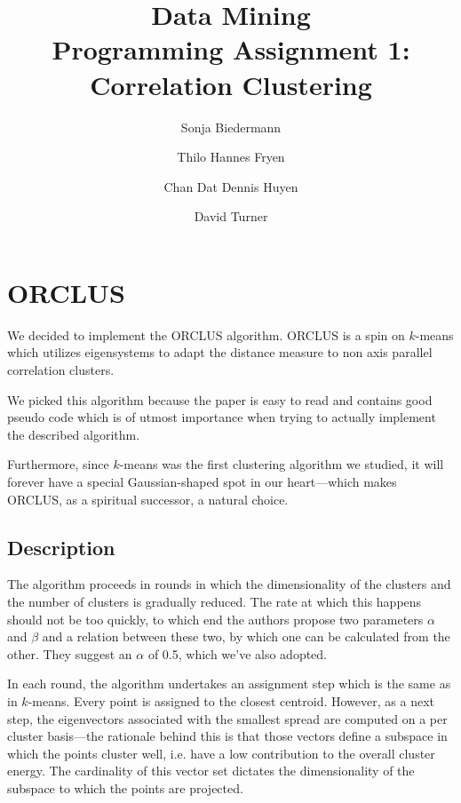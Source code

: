 \documentclass[english]{scrartcl}
\begin{document}
\title{Data Mining\\Programming Assignment 1: Correlation Clustering}

\author{Sonja Biedermann \and Thilo Hannes Fryen \and Chan Dat Dennis Huyen \and David Turner}

\maketitle
\tableofcontents

\section{ORCLUS}

We decided to implement the ORCLUS algorithm. ORCLUS is a spin on $k$-means
which utilizes eigensystems to adapt the distance measure to non axis parallel
correlation clusters.

We picked this algorithm because the paper is easy to read and contains good
pseudo code which is of utmost importance when trying to actually implement
the described algorithm.

Furthermore, since $k$-means was the first clustering algorithm we studied, it will forever
have a special Gaussian-shaped spot in our heart---which makes ORCLUS, as a
spiritual successor, a natural choice.

\subsection{Description}

The algorithm proceeds in rounds in which the dimensionality of the clusters
and the number of clusters is gradually reduced. The rate at which this happens should
not be too quickly, to which end the authors propose two parameters $\alpha$ and $\beta$
and a relation between these two, by which one can be calculated from the other. They
suggest an $\alpha$ of 0.5, which we've also adopted.

In each round, the algorithm undertakes an assignment step which is the same as
in $k$-means. Every point is assigned to the closest centroid. However, as a
next step, the eigenvectors associated with the smallest spread are computed on
a per cluster basis---the rationale behind this is that those vectors define a
subspace in which the points cluster well, i.e. have a low contribution to the
overall cluster energy. The cardinality of this vector set dictates the dimensionality
of the subspace to which the points are projected.
\end{document}
